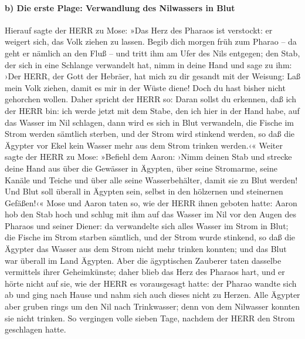 \hypertarget{b-die-erste-plage-verwandlung-des-nilwassers-in-blut}{%
\paragraph{b) Die erste Plage: Verwandlung des Nilwassers in
Blut}\label{b-die-erste-plage-verwandlung-des-nilwassers-in-blut}}

 Hierauf sagte der HERR zu Mose: »Das Herz des Pharaos
ist verstockt: er weigert sich, das Volk ziehen zu lassen.
 Begib dich morgen früh zum Pharao -- da geht er nämlich
an den Fluß -- und tritt ihm am Ufer des Nils entgegen; den Stab, der
sich in eine Schlange verwandelt hat, nimm in deine Hand 
und sage zu ihm: ›Der HERR, der Gott der Hebräer, hat mich zu dir
gesandt mit der Weisung: Laß mein Volk ziehen, damit es mir in der Wüste
diene! Doch du hast bisher nicht gehorchen wollen.  Daher
spricht der HERR so: Daran sollst du erkennen, daß ich der HERR bin: ich
werde jetzt mit dem Stabe, den ich hier in der Hand habe, auf das Wasser
im Nil schlagen, dann wird es sich in Blut verwandeln, 
die Fische im Strom werden sämtlich sterben, und der Strom wird stinkend
werden, so daß die Ägypter vor Ekel kein Wasser mehr aus dem Strom
trinken werden.‹«  Weiter sagte der HERR zu Mose:
»Befiehl dem Aaron: ›Nimm deinen Stab und strecke deine Hand aus über
die Gewässer in Ägypten, über seine Stromarme, seine Kanäle und Teiche
und über alle seine Wasserbehälter, damit sie zu Blut werden! Und Blut
soll überall in Ägypten sein, selbst in den hölzernen und steinernen
Gefäßen!‹«  Mose und Aaron taten so, wie der HERR ihnen
geboten hatte: Aaron hob den Stab hoch und schlug mit ihm auf das Wasser
im Nil vor den Augen des Pharaos und seiner Diener: da verwandelte sich
alles Wasser im Strom in Blut;  die Fische im Strom
starben sämtlich, und der Strom wurde stinkend, so daß die Ägypter das
Wasser aus dem Strom nicht mehr trinken konnten; und das Blut war
überall im Land Ägypten.  Aber die ägyptischen Zauberer
taten dasselbe vermittels ihrer Geheimkünste; daher blieb das Herz des
Pharaos hart, und er hörte nicht auf sie, wie der HERR es vorausgesagt
hatte:  der Pharao wandte sich ab und ging nach Hause und
nahm sich auch dieses nicht zu Herzen.  Alle Ägypter aber
gruben rings um den Nil nach Trinkwasser; denn von dem Nilwasser konnten
sie nicht trinken.  So vergingen volle sieben Tage,
nachdem der HERR den Strom geschlagen hatte.

